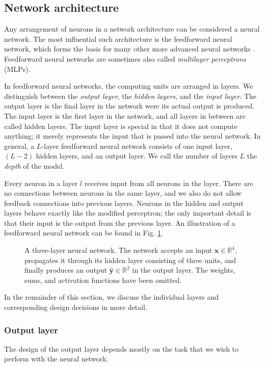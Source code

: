 \subsection{Network architecture}
Any arrangement of neurons in a network architecture can be considered a neural network. The most influential such architecture is the feedforward neural network, which forms the basis for many other more advanced neural networks \cite[Ch.\,6,\,p.\,163]{DBLP:books/daglib/0040158}. Feedforward neural networks are sometimes also called \emph{multilayer perceptrons} (MLPs).

In feedforward neural networks, the computing units are arranged in layers. We distinguish between the \emph{output layer}, the \emph{hidden layers}, and the \emph{input layer}. The output layer is the final layer in the network were its actual output is produced. The input layer is the first layer in the network, and all layers in between are called hidden layers. The input layer is special in that it does not compute anything; it merely represents the input that is passed into the neural network. In general, a $L$-layer feedforward neural network consists of one input layer, $(L-2)$ hidden layers, and an output layer. We call the number of layers $L$ the \emph{depth} of the model.

Every neuron in a layer $l$ receives input from all neurons in the  layer. There are no connections between neurons in the same layer, and we also do not allow feedback connections into previous layers. Neurons in the hidden and output layers behave exactly like the modified perceptron; the only important detail is that their input is the output from the previous layer. An illustration of a feedforward neural network can be found in Fig. \ref{fig:network}.
\begin{figure}
	\begin{center}
		
	\end{center}
	\caption{A three-layer neural network. The network accepts an input $\bm{x} \in \mathbb{R}^4$, propagates it through its hidden layer consisting of three units, and finally produces an output $\hat{\bm{y}} \in \mathbb{R}^2$ in the output layer. The weights, sums, and activation functions have been omitted.}
	\label{fig:network}
\end{figure}

In the remainder of this section, we discuss the individual layers and corresponding design decisions in more detail.

\subsubsection{Output layer}
The design of the output layer depends mostly on the task that we wish to perform with the neural network. 

